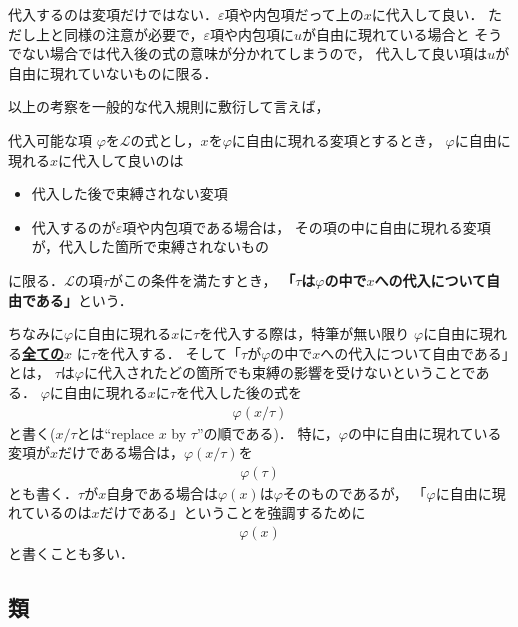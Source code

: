 	代入するのは変項だけではない．$\varepsilon$項や内包項だって上の$x$に代入して良い．
	ただし上と同様の注意が必要で，$\varepsilon$項や内包項に$u$が自由に現れている場合と
	そうでない場合では代入後の式の意味が分かれてしまうので，
	代入して良い項は$u$が自由に現れていないものに限る．
	
	以上の考察を一般的な代入規則に敷衍して言えば，
	
	\begin{itembox}[l]{代入可能な項}
		$\varphi$を$\mathcal{L}$の式とし，$x$を$\varphi$に自由に現れる変項とするとき，
		$\varphi$に自由に現れる$x$に代入して良いのは
		\begin{itemize}
			\item 代入した後で束縛されない変項
			\item 代入するのが$\varepsilon$項や内包項である場合は，
				その項の中に自由に現れる変項が，代入した箇所で束縛されないもの
		\end{itemize}
		に限る．$\mathcal{L}$の項$\tau$がこの条件を満たすとき，
		{\bf 「$\tau$は$\varphi$の中で$x$への代入について自由である」}という．
	\end{itembox}
	
	ちなみに$\varphi$に自由に現れる$x$に$\tau$を代入する際は，特筆が無い限り
	$\varphi$に自由に現れる\underline{{\bf 全ての$x$}} に$\tau$を代入する．
	そして「$\tau$が$\varphi$の中で$x$への代入について自由である」とは，
	$\tau$は$\varphi$に代入されたどの箇所でも束縛の影響を受けないということである．
	$\varphi$に自由に現れる$x$に$\tau$を代入した後の式を
	\begin{align}
		\varphi(x/\tau)
	\end{align}
	と書く($x/\tau$とは``replace $x$ by $\tau$''の順である)．
	特に，$\varphi$の中に自由に現れている変項が$x$だけである場合は，$\varphi(x/\tau)$を
	\begin{align}
		\varphi(\tau)
	\end{align}
	とも書く．$\tau$が$x$自身である場合は$\varphi(x)$は$\varphi$そのものであるが，
	「$\varphi$に自由に現れているのは$x$だけである」ということを強調するために
	\begin{align}
		\varphi(x)
	\end{align}
	と書くことも多い．
	
\subsection{類}
	\begin{comment}
	\begin{screen}
		\begin{dfn}[閉項]
			どの変項も自由に現れない$\varepsilon$項を
			{\bf 閉${\boldsymbol \varepsilon}$項}\index{
			へいイプシロンこう@閉$\varepsilon$項}{\bf (closed epsilon term)}と呼び，
			どの変項も自由に現れない内包項を{\bf 閉内包項}\index{
			へいないほうこう@閉内包項}{\bf (closed comprehension term)}と呼ぶ．
			また閉$\varepsilon$項と閉内包項は以上のみである．
		\end{dfn}
	\end{screen}
	\end{comment}
	
